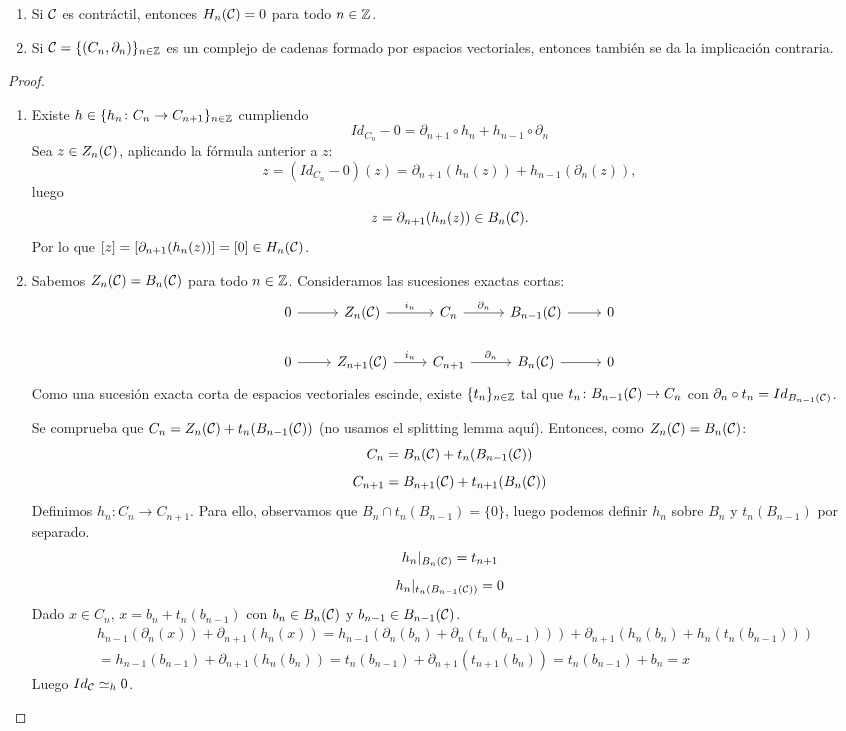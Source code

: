 \documentclass[HS.tex]{subfiles}
\begin{document}
\begin{prop}\mbox{}
\begin{enumerate}
\item Si $\mathcal{C}$ es contráctil, entonces $H_n(\mathcal{C}) = 0$ para todo $n \in \mathbb{Z}$.
\item Si $\mathcal{C} = \{(C_n,\partial_n)\}_{n \in \mathbb{Z}}$ es un complejo de cadenas formado por espacios vectoriales, entonces también se da la implicación contraria.
\end{enumerate}
\end{prop}
\begin{proof}\
\begin{enumerate}
\item Existe $h \in \{h_n \colon C_n \to C_{n+1}\}_{n \in \mathbb{Z}}$ cumpliendo 
\[ Id_{C_n}-0 = \partial_{n+1} \circ h_n + h_{n-1} \circ \partial_n \]
Sea $z \in Z_n(\mathcal{C})$, aplicando la fórmula anterior a $z$:
\[ z=(Id_{C_n}-0)(z) = \partial_{n+1}(h_n(z)) + h_{n-1}(\partial_n(z)), \]
luego
\[ z = \partial_{n+1}(h_n(z)) \in B_n(\mathcal{C}). \]
Por lo que $[z] = [\partial_{n+1}(h_n(z))] = [0] \in H_n(\mathcal{C})$.

\item Sabemos $Z_n(\mathcal{C}) = B_n(\mathcal{C})$ para todo $n \in \mathbb{Z}$.
Consideramos las sucesiones exactas cortas:
\[
\begin{tikzcd}
0 \arrow[r] & Z_n(\CC) \arrow[r,"i_n"] & C_n \arrow[r,"\partial_n"] & B_{n-1}(\CC)\arrow[r] &  0\\
0 \arrow[r] & Z_{n+1}(\CC) \arrow[r,"i_n"] & C_{n+1} \arrow[r,"\partial_n"] & B_n(\CC) \arrow[r]&  0
\end{tikzcd}
\]
Como una sucesión exacta corta de espacios vectoriales escinde, existe $\{t_n\}_{n \in \mathbb{Z}}$ tal que $t_n \colon B_{n-1}(\mathcal{C}) \to C_n$ con $\partial_n \circ t_n = Id_{B_{n-1}(\mathcal{C})}$.

Se comprueba que $C_n = Z_n(\mathcal{C}) + t_n(B_{n-1}(\mathcal{C}))$ (no usamos el splitting lemma aquí).
Entonces, como $Z_n(\mathcal{C}) = B_n(\mathcal{C})$:
\[ C_n = B_n(\mathcal{C}) + t_n(B_{n-1}(\mathcal{C})) \]
\[ C_{n+1}= B_{n+1}(\mathcal{C}) + t_{n+1}(B_n(\mathcal{C})) \]
Definimos $h_n \colon C_n \to C_{n+1}$. Para ello, observamos que $B_n \cap t_n(B_{n-1}) = \{0\}$, luego podemos definir $h_n$ sobre $B_n$ y $t_n(B_{n-1})$ por separado.
\[ h_n|_{B_n(\mathcal{C})} = t_{n+1} \]
\[ h_n|_{t_n(B_{n-1}(\mathcal{C}))} = 0 \]
Dado $x \in C_n$, $x = b_n + t_n(b_{n-1})$ con $b_n \in B_n(\mathcal{C})$ y $b_{n-1} \in B_{n-1}(\mathcal{C})$.
\begin{align*}
& h_{n-1}(\partial_n(x)) + \partial_{n+1}(h_n(x)) = h_{n-1}(\partial_n(b_n)+\partial_n(t_n(b_{n-1}))) + \partial_{n+1}(h_n(b_n)+h_n(t_n(b_{n-1}))) \\
& = h_{n-1}(b_{n-1}) + \partial_{n+1}(h_n(b_n)) = t_n(b_{n-1}) + \partial_{n+1}(t_{n+1}(b_n)) = t_n(b_{n-1})+b_n = x
\end{align*}
Luego $Id_{\mathcal{C}} \simeq_h 0$.
\end{enumerate}
\end{proof}
\end{document}
